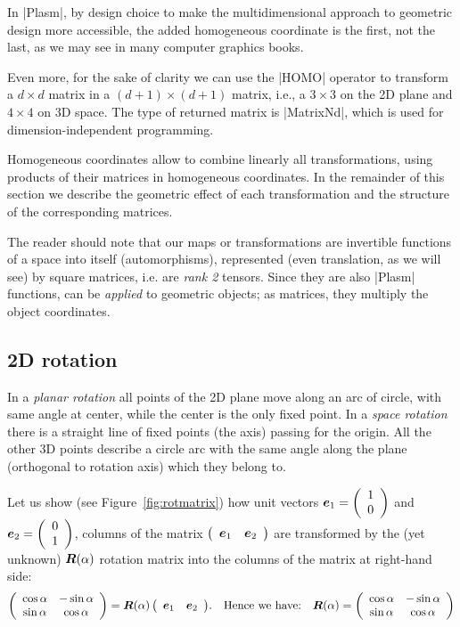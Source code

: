 In |Plasm|, by design choice to make the multidimensional approach to geometric design more accessible, the added homogeneous coordinate is the first, not the last, as we may see in many computer graphics books.

Even more, for the sake of clarity we can use the |HOMO| operator to transform a $d\times d$ matrix in a $(d+1)\times(d+1)$ matrix, i.e., a $3\times 3$ on the 2D plane and $4\times 4$ on 3D space. The type of returned matrix is |MatrixNd|, which is used for dimension-independent programming.

Homogeneous coordinates allow to combine linearly all transformations, using products of their matrices in homogeneous coordinates. In the remainder of this section we describe the geometric effect of each transformation and the structure of the corresponding matrices. 

\begin{remark}The reader should note that our maps or transformations are invertible functions of a space into itself (automorphisms), represented (even translation, as we will see) by square matrices, i.e. are \emph{rank 2} tensors. Since they are also |Plasm| functions, can be \emph{applied} to geometric objects; as matrices, they multiply the object coordinates.
\end{remark}




\subsection*{2D rotation}\label{sect:4-2-1}

In a \emph{planar rotation} all points of the 2D plane move along an arc of circle, with same angle at center, while the center is the only fixed point. In  a \emph{space rotation} there is a straight line of fixed points (the axis) passing for the origin. All the other 3D points describe a circle arc with the same angle along the plane (orthogonal to rotation axis) which they belong to. 

Let us show (see Figure~\ref{fig:rotmatrix}) how unit vectors ${\mbox{\boldmath $e$}}_1 = {\left(\begin{array}{cccccccc}1 \\ 0\end{array}\right)}$ and ${\mbox{\boldmath $e$}}_2 = {\left(\begin{array}{cccccccc}0 \\ 1\end{array}\right)}$, columns of the matrix ${\left(\begin{array}{cccccccc}{\mbox{\boldmath $e$}}_1 & {\mbox{\boldmath $e$}}_2 \end{array}\right)} $ are transformed by the (yet unknown) ${\mbox{\boldmath $R$}}(\alpha)$ rotation matrix into the columns of the matrix at right-hand side:
\[
{\left(\begin{array}{cccccccc}\cos\alpha & -\sin\alpha\\ \sin\alpha & \cos\alpha\end{array}\right)}
=
{\mbox{\boldmath $R$}}(\alpha)\,{\left(\begin{array}{cccccccc}{\mbox{\boldmath $e$}}_1 & {\mbox{\boldmath $e$}}_2 \end{array}\right)}. 
\quad
\mbox{Hence we have:}
\quad
{\mbox{\boldmath $R$}}(\alpha) = {\left(\begin{array}{cccccccc}\cos\alpha & -\sin\alpha\\ \sin\alpha & \cos\alpha\end{array}\right)}
\]


